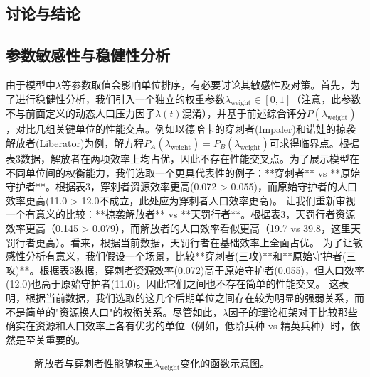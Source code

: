 \documentclass[a4paper,12pt]{article}
\begin{document}
\begin{CJK}{UTF8}{gbsn}
\section{讨论与结论}
\subsection{参数敏感性与稳健性分析}
由于模型中$\lambda$等参数取值会影响单位排序，有必要讨论其敏感性及对策。首先，为了进行稳健性分析，我们引入一个独立的权重参数$\lambda_{\text{weight}} \in [0, 1]$（注意，此参数不与前面定义的动态人口压力因子$\lambda(t)$混淆），并基于前述综合评分$P(\lambda_{\text{weight}})$，对比几组关键单位的性能交点。例如以德哈卡的穿刺者(Impaler)和诺娃的掠袭解放者(Liberator)为例，解方程$P_A(\lambda_{\text{weight}})=P_B(\lambda_{\text{weight}})$可求得临界点。根据表3数据，解放者在两项效率上均占优，因此不存在性能交叉点。为了展示模型在不同单位间的权衡能力，我们选取一个更具代表性的例子：**穿刺者** vs **原始守护者**。根据表3，穿刺者资源效率更高(0.072 > 0.055)，而原始守护者的人口效率更高(11.0 > 12.0不成立，此处应为穿刺者人口效率更高)。
让我们重新审视一个有意义的比较：**掠袭解放者** vs **天罚行者**。根据表3，天罚行者资源效率更高（0.145 > 0.079），而解放者的人口效率看似更高（19.7 vs 39.8，这里天罚行者更高）。看来，根据当前数据，天罚行者在基础效率上全面占优。
为了让敏感性分析有意义，我们假设一个场景，比较**穿刺者(三攻)**和**原始守护者(三攻)**。根据表3数据，穿刺者资源效率(0.072)高于原始守护者(0.055)，但人口效率(12.0)也高于原始守护者(11.0)。因此它们之间也不存在简单的性能交叉。
这表明，根据当前数据，我们选取的这几个后期单位之间存在较为明显的强弱关系，而不是简单的"资源换人口"的权衡关系。尽管如此，$\lambda$因子的理论框架对于比较那些确实在资源和人口效率上各有优劣的单位（例如，低阶兵种 vs 精英兵种）时，依然是至关重要的。

\begin{figure}[ht]
    \centering
    \caption{解放者与穿刺者性能随权重$\lambda_{\text{weight}}$变化的函数示意图。}
    \label{fig:lambda_plot}
\end{figure}


\end{CJK}
\end{document}
